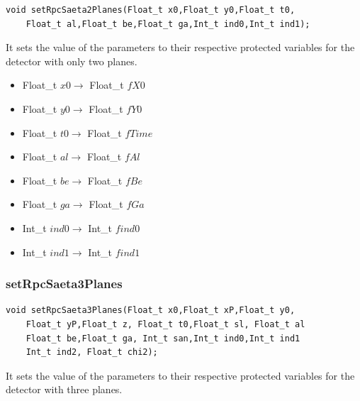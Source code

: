 \documentclass[a4paper]{book}
\begin{document}
\begin{lstlisting}
void setRpcSaeta2Planes(Float_t x0,Float_t y0,Float_t t0,
	Float_t al,Float_t be,Float_t ga,Int_t ind0,Int_t ind1);
\end{lstlisting}

It sets the value of the parameters to their respective protected variables for the detector with only two planes.

\begin{itemize}
	\item Float\_t $x0 \rightarrow$ Float\_t $fX0$
	\item Float\_t $y0 \rightarrow$ Float\_t $fY0$
	\item Float\_t $t0 \rightarrow$ Float\_t $fTime$
	\item Float\_t $al \rightarrow$ Float\_t $fAl$
	\item Float\_t $be \rightarrow$ Float\_t $fBe$
	\item Float\_t $ga \rightarrow$ Float\_t $fGa$
	\item Int\_t $ind0 \rightarrow$ Int\_t $find0$
	\item Int\_t $ind1 \rightarrow$ Int\_t $find1$
\end{itemize}

\subsubsection{setRpcSaeta3Planes}

\begin{lstlisting}
void setRpcSaeta3Planes(Float_t x0,Float_t xP,Float_t y0,
	Float_t yP,Float_t z, Float_t t0,Float_t sl, Float_t al
	Float_t be,Float_t ga, Int_t san,Int_t ind0,Int_t ind1
	Int_t ind2, Float_t chi2);
\end{lstlisting}

It sets the value of the parameters to their respective protected variables for the detector with three planes.
\end{document}
